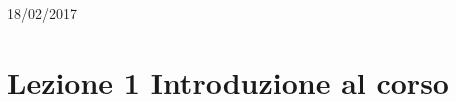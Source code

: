 \documentclass[10pt]{article}
\begin{document}
\begin{titlepage}


{\large 18/02/2017}\\[3cm] %




 

\vfill %

\end{titlepage}
\newpage
{}

\section{Lezione 1 Introduzione al corso}
\end{document}
